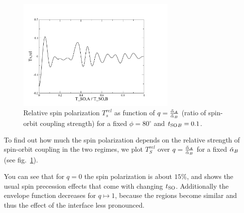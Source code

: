 \begin{figure}[htb]
    \begin{center}
        \includegraphics[width=0.7\textwidth]{polarization-so-so-rel.pdf}
    \end{center}
    \caption{Relative spin polarization $T_s^{rel}$ as function of $q 
=\frac{\tilde \alpha_A}{\tilde \alpha_B}$ (ratio of spin-orbit coupling strength) for a fixed
    $\phi=80^\circ$ and $t_{\textnormal{SO}}{}_B = 0.1$.}
    \label{fig:pol-so-so-rel}
\end{figure}

To find out how much the spin polarization depends on the relative strength of
spin-orbit coupling in the two regimes, we plot $T_S^{rel}$ over $q
=\frac{\tilde \alpha_A}{\tilde \alpha_B}$ for a fixed $\tilde \alpha_B$ (see fig.~\ref{fig:pol-so-so-rel}).

You can see that for $q = 0$ the spin polarization is about $15\%$, and shows
the usual spin precession effects that come with changing $t_{\textnormal{SO}}$. Additionally
the envelope function decreases for $q \mapsto 1$, because the regions become
similar and thus the effect of the interface less pronounced.


%

